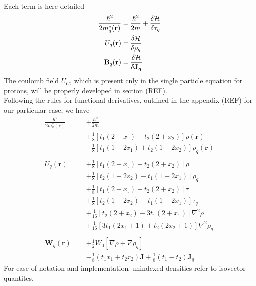 \\Each term is here detailed
\begin{align}
    \frac{\hbar^2}{2m^{*}_q(\mathbf r)} &= \frac{\hbar^2}{2m}+\fdv{\mathcal H}{\tau_q}
    \\U_q(\mathbf r) &= \fdv{\mathcal H}{\rho_q}
    \\\mathbf B_q(\mathbf r) &= \fdv{\mathcal H}{\boldsymbol{\mathbf J_q}}
\end{align}
The coulomb field $U_C$, which is present only in the single particle equation for protons, will be properly developed in section (REF).
\\Following the rules for functional derivatives, outlined in the appendix (REF) for our particular case, we have
\begin{align}
    \frac{\hbar^2}{2m_q^*(\mathbf r)} =& +\frac{\hbar^2}{2m} \\&+ \frac 1 8 [t_1(2+x_1)+t_2(2+x_2)]\rho(\mathbf r) \\&- \frac 1 8 [t_1(1+2x_1)+t_2(1+2x_2)]\rho_q(\mathbf r ) \\\\
    U_q(\mathbf r) =& +\frac 1 8 [t_1(2+x_1)+t_2(2+x_2)]\rho \\&+ \frac 1 8 [t_2(1+2x_2)-t_1(1+2x_1)]\rho_q \\
    &+ \frac 1 8 [t_1(2+x_1)+t_2(2+x_2)]\tau \\&+ \frac 1 8 [t_2(1+2x_2)-t_1(1+2x_1)]\tau_q \\
    &+ \frac 1 {16} [t_2(2+x_2)-3t_1(2+x_1)] \nabla^2 \rho \\&+ \frac 1 {16} [3t_1(2x_1+1)+t_2(2x_2+1)] \nabla^2 \rho_q \\\\
    \mathbf W_q (\mathbf r ) = &+\frac 1 2 W_0 [\nabla\rho + \nabla \rho_q] \\&-\frac 1 8 (t_1 x_1 + t_2 x_2) \mathbf J + \frac 1 8 (t_1 - t_2) \mathbf J_q 
\end{align}
For ease of notation and implementation, unindexed densities refer to isovector quantites.






